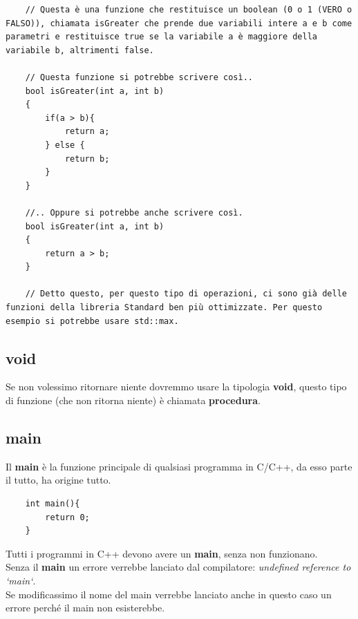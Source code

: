 \begin{lstlisting}
	// Questa è una funzione che restituisce un boolean (0 o 1 (VERO o FALSO)), chiamata isGreater che prende due variabili intere a e b come parametri e restituisce true se la variabile a è maggiore della variabile b, altrimenti false.
	
	// Questa funzione si potrebbe scrivere così..
	bool isGreater(int a, int b)
	{
		if(a > b){
			return a;
		} else {
			return b;
		}
	}

	//.. Oppure si potrebbe anche scrivere così.
	bool isGreater(int a, int b)
	{
		return a > b;
	}

	// Detto questo, per questo tipo di operazioni, ci sono già delle funzioni della libreria Standard ben più ottimizzate. Per questo esempio si potrebbe usare std::max.
\end{lstlisting}

\subsection{void}

\textsf{\small Se non volessimo ritornare niente dovremmo usare la tipologia \textbf{void}, questo tipo di funzione (che non ritorna niente) è chiamata \textbf{procedura}.} \\

\subsection{main}

\textsf{\small Il \textbf{main} è la funzione principale di qualsiasi programma in C/C++, da esso parte il tutto, ha origine tutto.} \\

\begin{lstlisting}
	int main(){
		return 0;
	}
\end{lstlisting}

\textsf{\small Tutti i programmi in C++ devono avere un \textbf{main}, senza non funzionano.} \\

\textsf{\small Senza il \textbf{main} un errore verrebbe lanciato dal compilatore: \emph{undefined reference to `main`}.} \\

\textsf{\small Se modificassimo il nome del main verrebbe lanciato anche in questo caso un errore perché il main non esisterebbe.} \\

